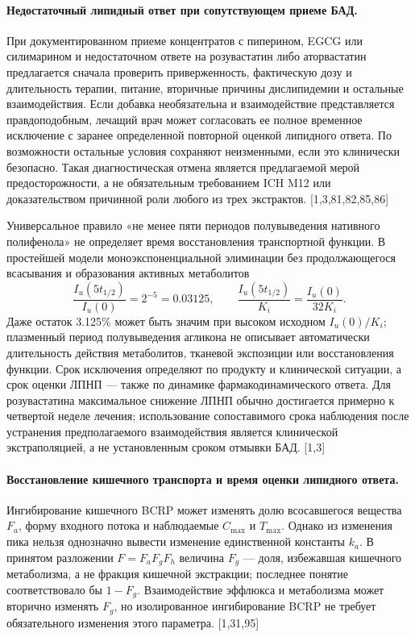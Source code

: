 \documentclass[11pt]{article}
\begin{document}
\paragraph{Недостаточный липидный ответ при сопутствующем приеме БАД.}
При документированном приеме концентратов с пиперином, EGCG или силимарином и недостаточном ответе на розувастатин либо аторвастатин предлагается сначала проверить приверженность, фактическую дозу и длительность терапии, питание, вторичные причины дислипидемии и остальные взаимодействия. Если добавка необязательна и взаимодействие представляется правдоподобным, лечащий врач может согласовать ее полное временное исключение с заранее определенной повторной оценкой липидного ответа. По возможности остальные условия сохраняют неизменными, если это клинически безопасно. Такая диагностическая отмена является предлагаемой мерой предосторожности, а не обязательным требованием ICH M12 или доказательством причинной роли любого из трех экстрактов. [1,3,81,82,85,86]

Универсальное правило «не менее пяти периодов полувыведения нативного полифенола» не определяет время восстановления транспортной функции. В простейшей модели моноэкспоненциальной элиминации без продолжающегося всасывания и образования активных метаболитов
\[
\frac{I_u(5t_{1/2})}{I_u(0)}=2^{-5}=0.03125,
\qquad
\frac{I_u(5t_{1/2})}{K_i}=\frac{I_u(0)}{32K_i}.
\]
Даже остаток 3.125\% может быть значим при высоком исходном \(I_u(0)/K_i\); плазменный период полувыведения агликона не описывает автоматически длительность действия метаболитов, тканевой экспозиции или восстановления функции. Срок исключения определяют по продукту и клинической ситуации, а срок оценки ЛПНП --- также по динамике фармакодинамического ответа. Для розувастатина максимальное снижение ЛПНП обычно достигается примерно к четвертой неделе лечения; использование сопоставимого срока наблюдения после устранения предполагаемого взаимодействия является клинической экстраполяцией, а не установленным сроком отмывки БАД. [1,3]

\paragraph{Восстановление кишечного транспорта и время оценки липидного ответа.}
Ингибирование кишечного BCRP может изменять долю всосавшегося вещества \(F_a\), форму входного потока и наблюдаемые \(C_{\max}\) и \(T_{\max}\). Однако из изменения пика нельзя однозначно вывести изменение единственной константы \(k_a\). В принятом разложении \(F=F_aF_gF_h\) величина \(F_g\) --- доля, избежавшая кишечного метаболизма, а не фракция кишечной экстракции; последнее понятие соответствовало бы \(1-F_g\). Взаимодействие эффлюкса и метаболизма может вторично изменять \(F_g\), но изолированное ингибирование BCRP не требует обязательного изменения этого параметра. [1,31,95]
\end{document}

